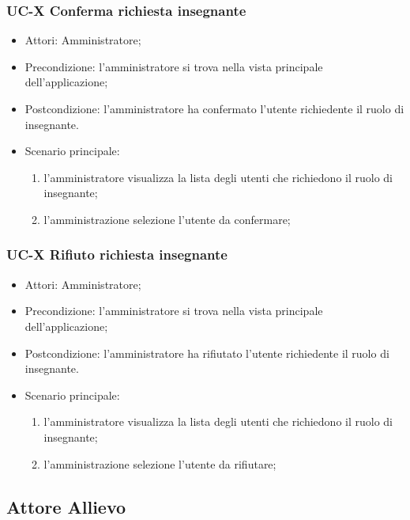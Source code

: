 	\subsubsection{UC-X Conferma richiesta insegnante}
		\begin{itemize}
			\item Attori: Amministratore;
			\item Precondizione: l'amministratore si trova nella vista principale dell'applicazione;
			\item Postcondizione: l'amministratore ha confermato l'utente richiedente il ruolo di insegnante.
			\item Scenario principale:
				\begin{enumerate}
					\item l'amministratore visualizza la lista degli utenti che richiedono il ruolo di insegnante;
					\item l'amministrazione selezione l'utente da confermare;
				\end{enumerate}
		\end{itemize}
					
	\subsubsection{UC-X Rifiuto richiesta insegnante}
		\begin{itemize}
			\item Attori: Amministratore;
			\item Precondizione: l'amministratore si trova nella vista principale dell'applicazione;
			\item Postcondizione: l'amministratore ha rifiutato l'utente richiedente il ruolo di insegnante.
			\item Scenario principale:
				\begin{enumerate}
					\item l'amministratore visualizza la lista degli utenti che richiedono il ruolo di insegnante;
					\item l'amministrazione selezione l'utente da rifiutare;
				\end{enumerate}
		\end{itemize}
					
					
					
\subsection{Attore Allievo}
